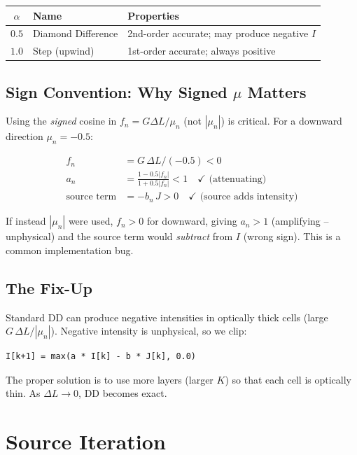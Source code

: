 \documentclass[12pt]{article}
\begin{document}
\begin{center}
\begin{tabular}{cll}
  \toprule
  $\alpha$ & Name & Properties \\
  \midrule
  $0.5$ & Diamond Difference & 2nd-order accurate; may produce negative $I$ \\
  $1.0$ & Step (upwind) & 1st-order accurate; always positive \\
  \bottomrule
\end{tabular}
\end{center}

\subsection{Sign Convention: Why Signed $\mu$ Matters}

Using the \emph{signed} cosine in $f_n = G\Delta L/\mu_n$ (not $|\mu_n|$) is
critical. For a downward direction $\mu_n = -0.5$:

\begin{align*}
  f_n &= G\,\Delta L / (-0.5) < 0 \\
  a_n &= \frac{1 - 0.5|f_n|}{1 + 0.5|f_n|} < 1 \quad\checkmark \text{ (attenuating)}\\
  \text{source term} &= -b_n\,J > 0 \quad\checkmark \text{ (source adds intensity)}
\end{align*}

If instead $|\mu_n|$ were used, $f_n > 0$ for downward, giving $a_n > 1$
(amplifying -- unphysical) and the source term would \emph{subtract} from $I$
(wrong sign). This is a common implementation bug.

\subsection{The Fix-Up}

Standard DD can produce negative intensities in optically thick cells (large
$G\,\Delta L / |\mu_n|$). Negative intensity is unphysical, so we clip:

\begin{lstlisting}
I[k+1] = max(a * I[k] - b * J[k], 0.0)
\end{lstlisting}

The proper solution is to use more layers (larger $K$) so that each cell is
optically thin. As $\Delta L \to 0$, DD becomes exact.

\section{Source Iteration}
\end{document}
